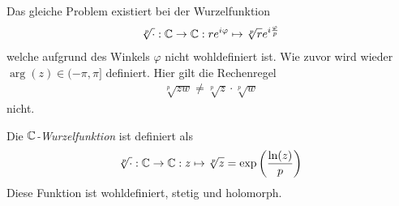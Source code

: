 \documentclass[ngerman]{report}
\begin{document}
Das gleiche Problem existiert bei der Wurzelfunktion
\begin{align*}
    \sqrt[p]{\cdot}: \mathbb{C}\to\mathbb{C}: re^{i\varphi} \mapsto \sqrt[p]{r}e^{i\frac{\varphi}{p}}
\end{align*}
welche aufgrund des Winkels $\varphi$ nicht wohldefiniert ist.
Wie zuvor wird wieder $\arg(z)\in (-\pi,\pi]$ definiert. Hier gilt die Rechenregel 
\begin{align*}
    \sqrt[p]{z w} \neq \sqrt[p]{z}\cdot \sqrt[p]{w}
\end{align*}
nicht. 
\begin{definition}[$\C$-Wurzelfunktion]
    Die \emph{$\C$-Wurzelfunktion} ist definiert als
    \begin{align*}
        \sqrt[p]{\cdot}:\mathbb{C}\to\mathbb{C}: z\mapsto \sqrt[p]{z} = \exp\left(\frac{\ln(z)}{p}\right)
    \end{align*}
    Diese Funktion ist wohldefiniert, stetig und holomorph.
\end{definition}
\end{document}
